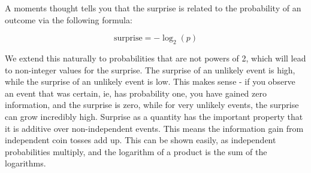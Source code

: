 \documentclass{article}
\begin{document}
\begin{figure}[H]
\centering
{}
\end{figure}

A moments thought tells you that the surprise is related to the probability of an outcome via the following formula:

\begin{equation*}
    \text{surprise} = -\log_2(p)
\end{equation*}

We extend this naturally to probabilities that are not powers of 2, which will lead to non-integer values for the surprise. The surprise of an unlikely event is high, while the surprise of an unlikely event is low. This makes sense - if you observe an event that was certain, ie, has probability one, you have gained zero information, and the surprise is zero, while for very unlikely events, the surprise can grow incredibly high. Surprise as a quantity has the important property that it is additive over non-independent events. This means the information gain from independent coin tosses add up. This can be shown easily, as independent probabilities multiply, and the logarithm of a product is the sum of the logarithms.\\
\end{document}
